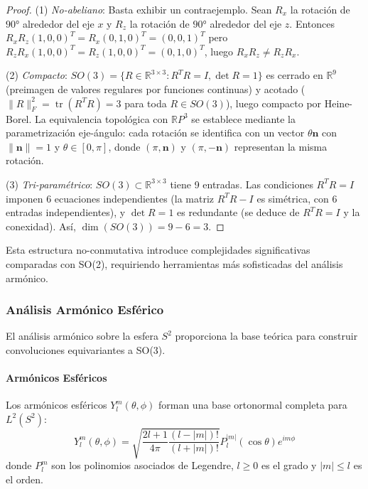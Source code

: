 \begin{proof}
(1) \textit{No-abeliano}: Basta exhibir un contraejemplo. Sean $R_x$ la rotación de $90°$ alrededor del eje $x$ y $R_z$ la rotación de $90°$ alrededor del eje $z$. Entonces $R_x R_z (1,0,0)^T = R_x(0,1,0)^T = (0,0,1)^T$ pero $R_z R_x (1,0,0)^T = R_z(1,0,0)^T = (0,1,0)^T$, luego $R_x R_z \neq R_z R_x$.

(2) \textit{Compacto}: $SO(3) = \{R \in \mathbb{R}^{3\times 3} : R^TR = I, \det R = 1\}$ es cerrado en $\mathbb{R}^{9}$ (preimagen de valores regulares por funciones continuas) y acotado ($\|R\|_F^2 = \operatorname{tr}(R^TR) = 3$ para toda $R \in SO(3)$), luego compacto por Heine-Borel. La equivalencia topológica con $\mathbb{R}P^3$ se establece mediante la parametrización eje-ángulo: cada rotación se identifica con un vector $\theta \mathbf{n}$ con $\|\mathbf{n}\| = 1$ y $\theta \in [0, \pi]$, donde $(\pi, \mathbf{n})$ y $(\pi, -\mathbf{n})$ representan la misma rotación.

(3) \textit{Tri-paramétrico}: $SO(3) \subset \mathbb{R}^{3 \times 3}$ tiene 9 entradas. Las condiciones $R^TR = I$ imponen 6 ecuaciones independientes (la matriz $R^TR - I$ es simétrica, con 6 entradas independientes), y $\det R = 1$ es redundante (se deduce de $R^TR = I$ y la conexidad). Así, $\dim(SO(3)) = 9 - 6 = 3$.
\end{proof}

Esta estructura no-conmutativa introduce complejidades significativas comparadas con SO(2), requiriendo herramientas más sofisticadas del análisis armónico.

\subsubsection{Análisis Armónico Esférico}

El análisis armónico sobre la esfera $S^2$ proporciona la base teórica para construir convoluciones equivariantes a SO(3).

\paragraph{Armónicos Esféricos}

\begin{definition}
Los armónicos esféricos $Y_l^m(\theta, \phi)$ forman una base ortonormal completa para $L^2(S^2)$:
\begin{equation}
Y_l^m(\theta, \phi) = \sqrt{\frac{2l+1}{4\pi}\frac{(l-|m|)!}{(l+|m|)!}} P_l^{|m|}(\cos \theta) e^{im\phi}
\end{equation}
donde $P_l^m$ son los polinomios asociados de Legendre, $l \geq 0$ es el grado y $|m| \leq l$ es el orden.
\end{definition}


